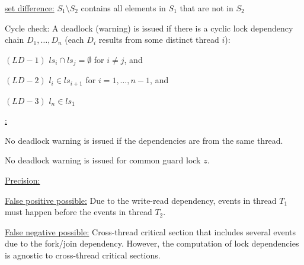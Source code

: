 \documentclass[landscape, a4paper]{article}
\begin{document}
\begin{minipage}[t]{0.2\linewidth}
\begin{betterlist}
\begin{betterlist}
			\adjustbox{scale=0.5}{
            \begin{dnumberedcodebox}[minted language=text,minted options={autogobble, fontsize=\tiny,numbersep=0.3cm,linenos}, box align=top]
            acq(t,y) {
                Ds = Ds U { (t,y,ls(t)) } if ls(t) != emptyset
                ls(t) = ls(t) U {y}
            }
            rel(t,y) {
                ls(t) = ls(t) \ {y}
            }
            fork(t1,t2) {
            }
            ...
            \end{dnumberedcodebox}
			}
			\begin{betterlist}
				\item \underline{set difference:} $S_1 \setminus S_2$ contains all elements in $S_1$ that are not in $S_2$
			\end{betterlist}
			\item \alert{Cycle check}: A deadlock (warning) is issued if there is a cyclic lock dependency chain $D_1, \ldots, D_n$ (each $D_i$ results from some distinct thread $i$):
			\begin{betterlist}
				\item $(LD-1)$ $ls_i \cap ls_j = \emptyset$ for $i \ne j$, and
				\item $(LD-2)$ $l_i \in ls_{i + 1}$ for $i = 1, \ldots, 𝑛 − 1$, and
				\item $(LD-3)$ $l_𝑛 \in ls_1$
			\end{betterlist}
			\item \underline{:}
			\begin{betterlist}
				\item No deadlock warning is issued if the dependencies are from the same thread. 
				\item No deadlock warning is issued for common guard lock $z$. 
			\end{betterlist}
			\item \underline{Precision:}
			\begin{betterlist}
				\item \underline{False positive possible:} Due to the \alert{write-read dependency}, events in thread $T_1$ must happen before the events in thread $T_2$. \script{160}{Example}
				\item \underline{False negative possible:} \alert{Cross-thread critical} section that includes several events due to the \alert{fork/join dependency}. However, the computation of lock dependencies is \alert{agnostic} to \alert{cross-thread critical sections}. \script{161}{Example}
			\end{betterlist}

		\end{betterlist}
    \item {}
	\end{betterlist}
\end{minipage}
\end{document}

